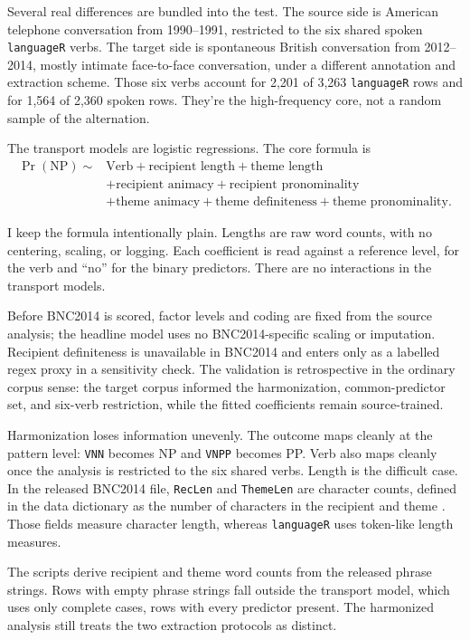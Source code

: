 Several real differences are bundled into the test. The source side is American
telephone conversation from 1990--1991, restricted to the six shared spoken
\texttt{languageR} verbs. The target side is spontaneous British conversation
from 2012--2014, mostly intimate face-to-face conversation, under a different
annotation and extraction scheme. Those six verbs account for 2,201 of 3,263
\texttt{languageR} rows and for 1,564 of 2,360 spoken rows. They're the
high-frequency core, not a random sample of the alternation.

The transport models are logistic regressions.
The core formula is
\[
\begin{aligned}
\Pr(\textrm{NP}) \sim{}&
  \textrm{Verb} + \textrm{recipient length} + \textrm{theme length} \\
&+ \textrm{recipient animacy} + \textrm{recipient pronominality} \\
&+ \textrm{theme animacy} + \textrm{theme definiteness}
  + \textrm{theme pronominality}.
\end{aligned}
\]

I keep the formula intentionally plain. Lengths are raw word counts, with no
centering, scaling, or logging. Each coefficient is read against a reference level,  for the
verb and \enquote{no} for the binary predictors.
There are no interactions in the transport models.

Before BNC2014 is scored, factor levels and coding are fixed from the source
analysis; the headline model uses no BNC2014-specific scaling or imputation.
Recipient definiteness is unavailable in BNC2014 and enters only as a labelled
regex proxy in a sensitivity check. The validation is retrospective in the
ordinary corpus sense: the target corpus informed the harmonization,
common-predictor set, and six-verb restriction, while the fitted coefficients
remain source-trained.

Harmonization loses information unevenly. The outcome maps cleanly at the
pattern level: \texttt{VNN} becomes NP and \texttt{VNPP} becomes PP. Verb also
maps cleanly once the analysis is restricted to the six shared verbs. Length is
the difficult case. In the released BNC2014 file, \texttt{RecLen} and
\texttt{ThemeLen} are character counts, defined in the data dictionary as the
number of characters in the recipient and theme
\citep{JensetMcGillivray2019Dative}. Those fields measure character length,
whereas \texttt{languageR} uses token-like length measures.

The scripts derive recipient and theme word counts from the released
phrase strings. Rows with empty phrase strings fall outside the
transport model, which uses only complete cases, rows with every predictor
present. The harmonized analysis still treats the two
extraction protocols as distinct.

